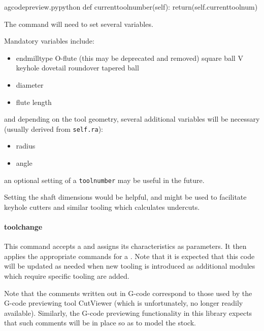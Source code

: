 \documentclass{ltxdoc}
\begin{document}
\lstset{firstnumber=\thegcpy}
\begin{writecode}{a}{gcodepreview.py}{python}
    def currenttoolnumber(self):
        return(self.currenttoolnum)

\end{writecode}
\addtocounter{gcpy}{3}


The  command will need to set several variables.

Mandatory variables include:

\begin{itemize}
\item endmilltype
\subitem O-flute (this may be deprecated and removed)
\subitem square
\subitem ball
\subitem V
\subitem keyhole
\subitem dovetail
\subitem roundover
\subitem tapered ball
\item diameter
\item flute length
\end{itemize}

\noindent and depending on the tool geometry, several additional variables will be necessary (usually derived from \verb|self.ra|):

\begin{itemize}
\item radius
\item angle
\end{itemize}

\noindent an optional setting of a \verb|toolnumber| may be useful in the future.

Setting the shaft dimensions would be helpful, and might be used to facilitate keyhole cutters and similar tooling which calculates undercuts.

\paragraph{toolchange}

This command accepts a  and assigns its characteristics as parameters. It then applies the appropriate commands for a \label{subsubsec:toolchange} . Note that it is expected that this code will be updated as needed when new tooling is introduced as additional modules which require specific tooling are added. 

Note that the comments written out in G-code correspond to those used by the G-code previewing tool CutViewer (which is unfortunately, no longer readily available). Similarly, the G-code previewing functionality in this library expects that such comments will be in place so as to model the stock.
\end{document}
